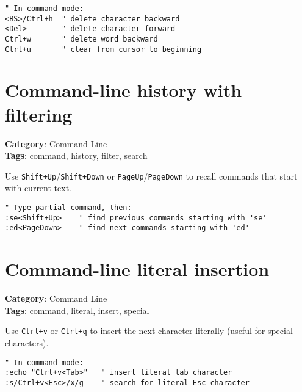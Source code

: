 {{{{\begin{Exa*}{}
\begin{Verbatim}[fontsize=\footnotesize, breaklines, breakanywhere]
" In command mode:
<BS>/Ctrl+h  " delete character backward
<Del>        " delete character forward
Ctrl+w       " delete word backward
Ctrl+u       " clear from cursor to beginning
\end{Verbatim}
\end{Exa*}

\section{Command-line history with filtering}

\textbf{Category}: Command Line\\ \textbf{Tags}: command, history, filter, search
\vspace{0.5cm}

Use {\footnotesize \Verb§Shift+Up§}/{\footnotesize \Verb§Shift+Down§} or {\footnotesize \Verb§PageUp§}/{\footnotesize \Verb§PageDown§} to recall commands that start with current text.

\begin{Exa*}{}
\begin{Verbatim}[fontsize=\footnotesize, breaklines, breakanywhere]
" Type partial command, then:
:se<Shift+Up>    " find previous commands starting with 'se'
:ed<PageDown>    " find next commands starting with 'ed'
\end{Verbatim}
\end{Exa*}

\section{Command-line literal insertion}

\textbf{Category}: Command Line\\ \textbf{Tags}: command, literal, insert, special
\vspace{0.5cm}

Use {\footnotesize \Verb§Ctrl+v§} or {\footnotesize \Verb§Ctrl+q§} to insert the next character literally (useful for special characters).

\begin{Exa*}{}
\begin{Verbatim}[fontsize=\footnotesize, breaklines, breakanywhere]
" In command mode:
:echo "Ctrl+v<Tab>"   " insert literal tab character
:s/Ctrl+v<Esc>/x/g    " search for literal Esc character
\end{Verbatim}
\end{Exa*}

}}}}
